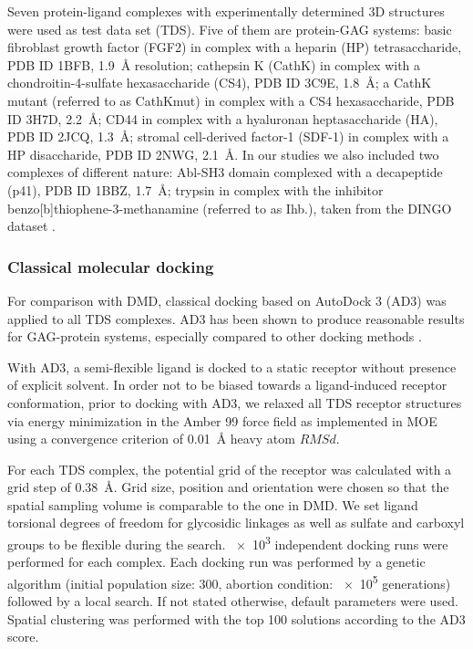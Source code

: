 Seven protein-ligand complexes with experimentally determined 3D structures were
used as test data set (TDS). Five of them are protein-GAG systems: basic
fibroblast growth factor (FGF2) in complex with a heparin (HP) tetrasaccharide,
PDB ID 1BFB, \SI{1.9}{\angstrom} resolution; cathepsin K (CathK) in complex with
a chondroitin-4-sulfate hexasaccharide (CS4), PDB ID 3C9E, \SI{1.8}{\angstrom};
a CathK mutant (referred to as CathKmut) in complex with a CS4 hexasaccharide,
PDB ID 3H7D, \SI{2.2}{\angstrom}; CD44 in complex with a hyaluronan
heptasaccharide (HA), PDB ID 2JCQ, \SI{1.3}{\angstrom}; stromal cell-derived
factor-1 (SDF-1) in complex with a HP disaccharide, PDB ID 2NWG,
\SI{2.1}{\angstrom}. In our studies we also included two complexes of different
nature: Abl-SH3 domain complexed with a decapeptide (p41), PDB ID 1BBZ,
\SI{1.7}{\angstrom}; trypsin in complex with the inhibitor
benzo[b]thiophene-3-methanamine (referred to as Ihb.), taken from the DINGO
dataset \cite{newman_dingo_2012}.

\subsubsection{Classical molecular docking}

For comparison with DMD, classical docking based on AutoDock
3 \cite{Morris1998} (AD3) was applied to all TDS complexes. AD3 has
been shown to produce reasonable results for GAG-protein systems, especially
compared to other docking methods \cite{japan_docking_ad3_clustering,
samsonov_docking_2011, imberty_perez_protgag_comp_book_2006,
franz_cathepsin_2013}.

With AD3, a semi-flexible ligand is docked to a static receptor without presence
of explicit solvent. In order not to be biased towards a ligand-induced receptor
conformation, prior to docking with AD3, we relaxed all TDS receptor structures
via energy minimization in the Amber 99 force field as implemented in MOE
\cite{chemical_computing_group_inc_moe_2010} using a convergence criterion of
\SI{0.01}{\angstrom} heavy atom $RMSd$.

For each TDS complex, the potential grid of the receptor was calculated with a
grid step of \SI{0.38}{\angstrom}. Grid size, position and orientation were
chosen so that the spatial sampling volume is comparable to the one in DMD. We
set ligand torsional degrees of freedom for glycosidic linkages as well as
sulfate and carboxyl groups to be flexible during the search. \num{e3}
independent docking runs were performed for each complex. Each docking run was
performed by a genetic algorithm (initial population size: 300, abortion
condition: \num{e5} generations) followed by a local search. If not stated
otherwise, default parameters were used. Spatial clustering was performed with
the top 100 solutions according to the AD3 score.

